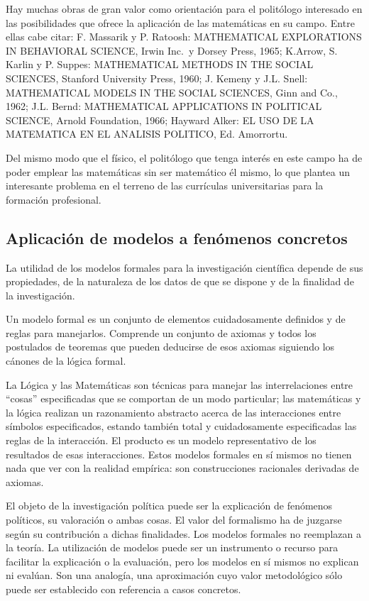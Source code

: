 \documentclass[
]{book}
\begin{document}
Hay muchas obras de gran valor como orientación para el politólogo interesado en las posibilidades que ofrece la aplicación de las matemáticas en su campo. Entre ellas cabe citar: F. Massarik y P. Ratoosh: MATHEMATICAL EXPLORATIONS IN BEHAVIORAL SCIENCE, Irwin Inc.~y Dorsey Press, 1965; K.Arrow, S. Karlin y P. Suppes: MATHEMATICAL METHODS IN THE SOCIAL SCIENCES, Stanford University Press, 1960; J. Kemeny y J.L. Snell: MATHEMATICAL MODELS IN THE SOCIAL SCIENCES, Ginn and Co., 1962; J.L. Bernd: MATHEMATICAL APPLICATIONS IN POLITICAL SCIENCE, Arnold Foundation, 1966; Hayward Alker: EL USO DE LA MATEMATICA EN EL ANALISIS POLITICO, Ed. Amorrortu.

Del mismo modo que el físico, el politólogo que tenga interés en este campo ha de poder emplear las matemáticas sin ser matemático él mismo, lo que plantea un interesante problema en el terreno de las currículas universitarias para la formación profesional.

\hypertarget{aplicaciuxf3n-de-modelos-a-fenuxf3menos-concretos}{%
\subsection*{Aplicación de modelos a fenómenos concretos}\label{aplicaciuxf3n-de-modelos-a-fenuxf3menos-concretos}}

La utilidad de los modelos formales para la investigación científica depende de sus propiedades, de la naturaleza de los datos de que se dispone y de la finalidad de la investigación.

Un modelo formal es un conjunto de elementos cuidadosamente definidos y de reglas para manejarlos. Comprende un conjunto de axiomas y todos los postulados de teoremas que pueden deducirse de esos axiomas siguiendo los cánones de la lógica formal.

La Lógica y las Matemáticas son técnicas para manejar las interrelaciones entre ``cosas'' especificadas que se comportan de un modo particular; las matemáticas y la lógica realizan un razonamiento abstracto acerca de las interacciones entre símbolos especificados, estando también total y cuidadosamente especificadas las reglas de la interacción. El producto es un modelo representativo de los resultados de esas interacciones. Estos modelos formales en sí mismos no tienen nada que ver con la realidad empírica: son construcciones racionales derivadas de axiomas.

El objeto de la investigación política puede ser la explicación de fenómenos políticos, su valoración o ambas cosas. El valor del formalismo ha de juzgarse según su contribución a dichas finalidades. Los modelos formales no reemplazan a la teoría. La utilización de modelos puede ser un instrumento o recurso para facilitar la explicación o la evaluación, pero los modelos en sí mismos no explican ni evalúan. Son una analogía, una aproximación cuyo valor metodológico sólo puede ser establecido con referencia a casos concretos.
\end{document}
